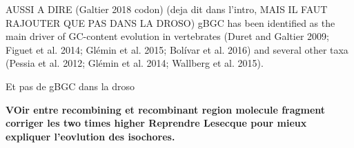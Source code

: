 AUSSI A DIRE (Galtier 2018 codon) (deja dit dans l'intro, MAIS IL FAUT RAJOUTER QUE PAS DANS LA DROSO)
gBGC has been identified as the main driver of GC-content evolution in vertebrates (Duret and Galtier 2009; Figuet et al. 2014; Glémin et al. 2015; Bolívar et al. 2016) and several other taxa (Pessia et al. 2012; Glémin et al. 2014; Wallberg et al. 2015).

Et pas de gBGC dans la droso



\textbf{VOir entre recombining et recombinant region molecule fragment
corriger les two times higher
Reprendre Lesecque pour mieux expliquer l'eovlution des isochores.}


%





